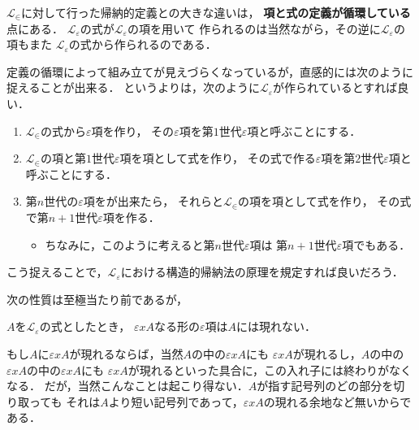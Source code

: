 	$\mathcal{L}_{\in}$に対して行った帰納的定義との大きな違いは，
	{\bf 項と式の定義が循環している}点にある．
	$\mathcal{L}_{\varepsilon}$の式が$\mathcal{L}_{\varepsilon}$の項を用いて
	作られるのは当然ながら，その逆に$\mathcal{L}_{\varepsilon}$の項もまた
	$\mathcal{L}_{\varepsilon}$の式から作られるのである．
	
	定義の循環によって組み立てが見えづらくなっているが，直感的には次のように捉えることが出来る．
	というよりは，次のように$\mathcal{L}_{\varepsilon}$が作られているとすれば良い．
	
	\begin{enumerate}
		\item $\mathcal{L}_{\in}$の式から$\varepsilon$項を作り，
			その$\varepsilon$項を第$1$世代$\varepsilon$項と呼ぶことにする．
		\item $\mathcal{L}_{\in}$の項と第$1$世代$\varepsilon$項を項として式を作り，
			その式で作る$\varepsilon$項を第$2$世代$\varepsilon$項と呼ぶことにする．
		\item 第$n$世代の$\varepsilon$項をが出来たら，
			それらと$\mathcal{L}_{\in}$の項を項として式を作り，
			その式で第$n+1$世代$\varepsilon$項を作る．
			
			\begin{itemize}
				\item ちなみに，このように考えると第$n$世代$\varepsilon$項は
					第$n+1$世代$\varepsilon$項でもある．
			\end{itemize}
	\end{enumerate}
	
	こう捉えることで，$\mathcal{L}_{\varepsilon}$における構造的帰納法の原理を規定すれば良いだろう．
	
	次の性質は至極当たり前であるが，
	
	\begin{screen}
		\begin{metathm}[無限入れ子は起こらない]
			$A$を$\mathcal{L}_{\varepsilon}$の式としたとき，
			$\varepsilon x A$なる形の$\varepsilon$項は$A$には現れない．
		\end{metathm}
	\end{screen}
	
	もし$A$に$\varepsilon x A$が現れるならば，当然$A$の中の$\varepsilon x A$にも
	$\varepsilon x A$が現れるし，$A$の中の$\varepsilon x A$の中の$\varepsilon x A$にも
	$\varepsilon x A$が現れるといった具合に，この入れ子には終わりがなくなる．
	だが，当然こんなことは起こり得ない．$A$が指す記号列のどの部分を切り取っても
	それは$A$より短い記号列であって，$\varepsilon x A$の現れる余地など無いからである．
	
